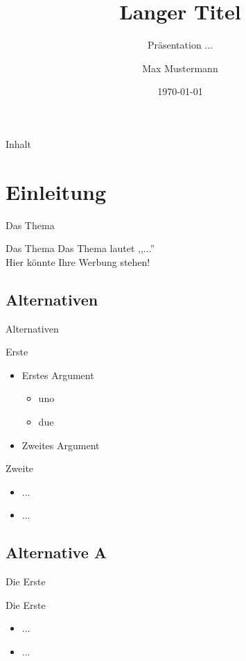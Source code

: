 \documentclass[mathserif,9pt]{beamer}
\title[Kurztitel]{Langer Titel}
\subtitle{Präsentation ...}
\author{Max Mustermann}
\institute{FB Technik | Abteilung Elektrotechnik und Informatik}
\date{\today}
\begin{document}
	\titleframe		%
	
	\begin{frame}{Inhalt}
			\tableofcontents%
	\end{frame}

	\section{Einleitung}
		\begin{frame}{Das Thema}
			\begin{block}{Das Thema}
				Das Thema lautet ,,...''\\
				Hier könnte Ihre Werbung stehen!
			\end{block}
		\end{frame}
	
		\subsection{Alternativen}
			\begin{frame}{Alternativen}
				\begin{block}{Erste}
					\begin{itemize}
						\item Erstes Argument
							\begin{itemize}
							\item uno
							\item due
							\end{itemize}
						\item Zweites Argument
					\end{itemize}
				\end{block}
				
				\begin{block}{Zweite}
					\begin{itemize}
						\item ...
						\item ...
					\end{itemize}
				\end{block}
				
			\end{frame}

		\subsection{Alternative A}
			\begin{frame}{Die Erste}
				\begin{block}{Die Erste}
					\begin{itemize}
						\item ...
						\item ...
					\end{itemize}
				\end{block}
			\end{frame}
\end{document}
